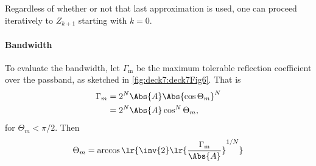 Regardless of whether or not that last approximation is used, one can proceed iteratively to \( Z_{k+1} \) starting with \( k = 0 \).
\paragraph{Bandwidth}
To evaluate the bandwidth, let \( \Gamma_{\mathrm{m}} \) be the maximum tolerable reflection coefficient over the passband, as sketched in \cref{fig:deck7:deck7Fig6}.
That is
\begin{equation}\label{eqn:uwavesDeck7MultisectionTransformersCore:400}
\begin{aligned}
\Gamma_m
&= 2^N \Abs{A} \Abs{\cos \Theta_m }^N
\\ &= 2^N \Abs{A} \cos^N \Theta_m,
\end{aligned}
\end{equation}
for \( \Theta_m < \pi/2 \).  Then
\begin{equation}\label{eqn:uwavesDeck7MultisectionTransformersCore:420}
\Theta_m = \arccos\lr{ \inv{2} \lr{ \frac{\Gamma_{\mathrm{m}}}{\Abs{A}}}^{1/N} }
\end{equation}

